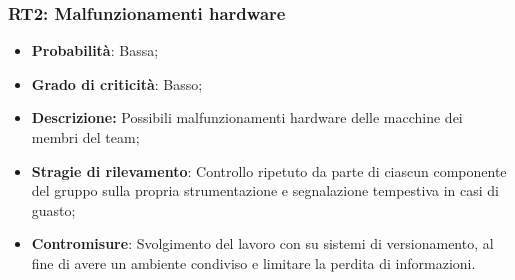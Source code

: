 \subsubsection{RT2: Malfunzionamenti hardware}
\begin{itemize}
    \item \textbf{Probabilità}: Bassa;
    \item \textbf{Grado di criticità}: Basso;
    \item \textbf{Descrizione:} Possibili malfunzionamenti hardware delle macchine dei membri del team;
    \item \textbf{Stragie di rilevamento}: Controllo ripetuto da parte di ciascun componente del gruppo sulla propria strumentazione e segnalazione tempestiva in casi di guasto;
    \item \textbf{Contromisure}: Svolgimento del lavoro con  su sistemi di versionamento, al fine di avere un ambiente condiviso e limitare la perdita di informazioni.  
\end{itemize}
